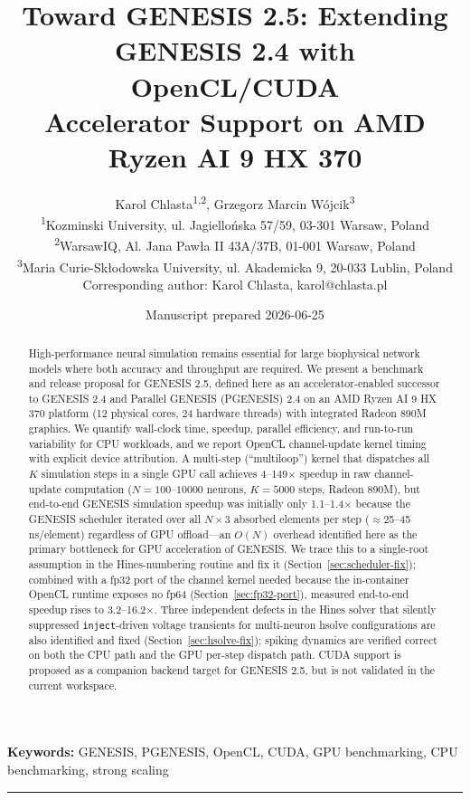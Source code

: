 \documentclass[11pt,a4paper]{article}
\title{\textbf{Toward GENESIS 2.5: Extending GENESIS 2.4 with OpenCL/CUDA\\
Accelerator Support on AMD Ryzen AI 9 HX 370}}
\author{Karol Chlasta\textsuperscript{1,2}, Grzegorz Marcin W\'ojcik\textsuperscript{3}\\[6pt]
\small\textsuperscript{1}Kozminski University, ul. Jagiello\'nska 57/59, 03-301 Warsaw, Poland\\[2pt]
\small\textsuperscript{2}WarsawIQ, Al. Jana Paw\l{}a II 43A/37B, 01-001 Warsaw, Poland\\[2pt]
\small\textsuperscript{3}Maria Curie-Sk{\l}odowska University, ul. Akademicka 9, 20-033 Lublin, Poland\\[4pt]
\small Corresponding author: Karol Chlasta, karol@chlasta.pl}
\date{Manuscript prepared 2026-06-25}
\begin{document}
\maketitle
\thispagestyle{fancy}

\begin{abstract}
High-performance neural simulation remains essential for large biophysical network models where both accuracy and throughput are required. We present a benchmark and release proposal for GENESIS 2.5, defined here as an accelerator-enabled successor to GENESIS 2.4 and Parallel GENESIS (PGENESIS) 2.4 on an AMD Ryzen AI 9 HX 370 platform (12 physical cores, 24 hardware threads) with integrated Radeon 890M graphics. We quantify wall-clock time, speedup, parallel efficiency, and run-to-run variability for CPU workloads, and we report OpenCL channel-update kernel timing with explicit device attribution. A multi-step (``multiloop'') kernel that dispatches all $K$ simulation steps in a single GPU call achieves 4--149$\times$ speedup in raw channel-update computation ($N=100$--$10000$ neurons, $K=5000$ steps, Radeon 890M), but end-to-end GENESIS simulation speedup was initially only 1.1--1.4$\times$ because the GENESIS scheduler iterated over all $N\times3$ absorbed elements per step ($\approx$25--45\,ns/element) regardless of GPU offload---an $O(N)$ overhead identified here as the primary bottleneck for GPU acceleration of GENESIS. We trace this to a single-root assumption in the Hines-numbering routine and fix it (Section~\ref{sec:scheduler-fix}); combined with a fp32 port of the channel kernel needed because the in-container OpenCL runtime exposes no fp64 (Section~\ref{sec:fp32-port}), measured end-to-end speedup rises to 3.2--16.2$\times$. Three independent defects in the Hines solver that silently suppressed \texttt{inject}-driven voltage transients for multi-neuron hsolve configurations are also identified and fixed (Section~\ref{sec:hsolve-fix}); spiking dynamics are verified correct on both the CPU path and the GPU per-step dispatch path. CUDA support is proposed as a companion backend target for GENESIS 2.5, but is not validated in the current workspace.
\end{abstract}

\textbf{Keywords:} GENESIS, PGENESIS, OpenCL, CUDA, GPU benchmarking, CPU benchmarking, strong scaling

\vspace{1em}
\hrule
\vspace{1em}

\end{document}
